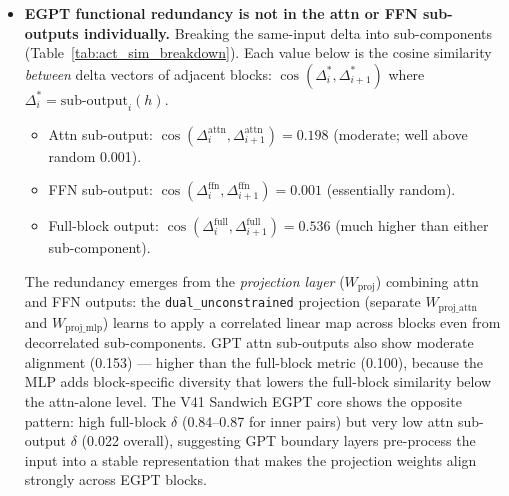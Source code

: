 \begin{itemize}
  \item \textbf{EGPT functional redundancy is not in the attn or FFN sub-outputs individually.}
        Breaking the same-input delta into sub-components (Table~\ref{tab:act_sim_breakdown}).
        Each value below is the cosine similarity \emph{between} delta vectors of adjacent blocks:
        $\cos(\Delta_i^*, \Delta_{i+1}^*)$ where $\Delta_i^* = \mathrm{sub\text{-}output}_i(h)$.
        \begin{itemize}
          \item Attn sub-output: $\cos(\Delta^\mathrm{attn}_i, \Delta^\mathrm{attn}_{i+1}) = 0.198$ (moderate; well above random 0.001).
          \item FFN sub-output: $\cos(\Delta^\mathrm{ffn}_i, \Delta^\mathrm{ffn}_{i+1}) = 0.001$ (essentially random).
          \item Full-block output: $\cos(\Delta^\mathrm{full}_i, \Delta^\mathrm{full}_{i+1}) = \mathbf{0.536}$ (much higher than either sub-component).
        \end{itemize}
        The redundancy emerges from the \emph{projection layer} ($W_\mathrm{proj}$) combining
        attn and FFN outputs: the \texttt{dual\_unconstrained} projection (separate $W_\mathrm{proj\_attn}$
        and $W_\mathrm{proj\_mlp}$) learns to apply a correlated linear map across blocks even
        from decorrelated sub-components.
        GPT attn sub-outputs also show moderate alignment (0.153) --- higher than the full-block
        metric (0.100), because the MLP adds block-specific diversity that lowers the full-block
        similarity below the attn-alone level.
        The V41 Sandwich EGPT core shows the opposite pattern: high full-block $\delta$ (0.84--0.87 for
        inner pairs) but very low attn sub-output $\delta$ (0.022 overall), suggesting GPT boundary layers
        pre-process the input into a stable representation that makes the projection weights align
        strongly across EGPT blocks.
\end{itemize}

